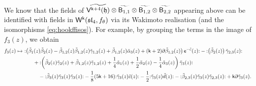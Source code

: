 \documentclass[10pt,a4paper]{amsart}
\numberwithin{equation}{section}
\newcommand{\ee}{\mathsf{e}}   %
\newcommand{\kk}{\mathsf{k}}   %
\DeclarePairedDelimiter{\brac}{\lparen}{\rparen}   %
\newcommand{\no}[1]{\mathopen{:} #1 \mathclose{:}} %
\newcommand{\alg}[1]{\mathfrak{#1}}  %
\newcommand{\VOA}[1]{\mathsf{#1}}    %
\newcommand{\SLA}[2]{\alg{#1}_{#2}}                      %
\newcommand{\slfour}{\SLA{sl}{4}}
\newcommand{\fmin}{f_\theta}                                        %
\newcommand{\Wsymb}{\VOA{W}}
\newcommand{\uaffvoa}[2]{\VOA{V}^{#1}\brac{#2}}                   %
\newcommand{\bgvoa}{\VOA{B}}                                      %
\newcommand{\uQHR}[3]{\Wsymb^{#1}\brac{#2,#3}}                    %
\theoremstyle{plain}
\begin{document}
We know that the fields of $\widetilde{\uaffvoa{\kk+4}{\mathfrak{h}}} \otimes \widetilde{\bgvoa_{1,1}} \otimes \widetilde{\bgvoa_{1,2}} \otimes \widetilde{\bgvoa_{2,2}}$ appearing above can be identified with fields in $\uQHR{\kk}{\slfour}{\fmin}$ via its Wakimoto realisation (and the isomorphisms \eqref{eq:hookffisos}). For example, by grouping the terms in the image of $f_3(z)$, we obtain
%
\begin{align} \label{eq:sl4mintoaffF3}
    f_3(z) \mapsto&\ \no{\left(\tilde{\beta}_1(z) \tilde{\beta}_2(z) - \tilde{\beta}_{1,2}(z) \tilde{\beta}_{1,2}(z) \tilde{\gamma}_{1,2}(z)  + \tilde{\beta}_{1,2}(z) \tilde{\alpha}_3(z) + (\kk+2)\partial \tilde{\beta}_{1,2}(z)\right) \ee^{-\tilde{c}}(z)} - \no{\left(\tilde{\beta}_2(z)\right) \tilde{\gamma}_{2,3}(z)} \\
    &\hspace{2em} +  \no{\left(\tilde{\beta}_{2}(z)\tilde{\gamma}_{2}(z)+\tilde{\beta}_{1,2}(z)\tilde{\gamma}_{1,2}(z) + \frac{1}{4}\tilde{\alpha}_1(z)+ \frac{1}{2}  \tilde{\alpha}_2(z) - \frac{1}{4} \tilde{\alpha}_3(z) \right) \tilde{\gamma}_{3}(z)} \notag\\
    &\hspace{3em}- \no{\tilde{\beta}_{3}(z) \tilde{\gamma}_{3}(z) \tilde{\gamma}_{3}(z)}  - \frac{1}{8}(5\kk+16) \no{\tilde{\gamma}_3(z) \tilde{c}(z)} - \frac{1}{2}\no{\tilde{\gamma}_3(z) \tilde{d}(z)}  - \no{\tilde{\beta}_{2,3}(z)\tilde{\gamma}_3(z)\tilde{\gamma}_{2,3}(z)} + \kk \partial \tilde{\gamma}_3(z). \notag
\end{align}
\end{document}
